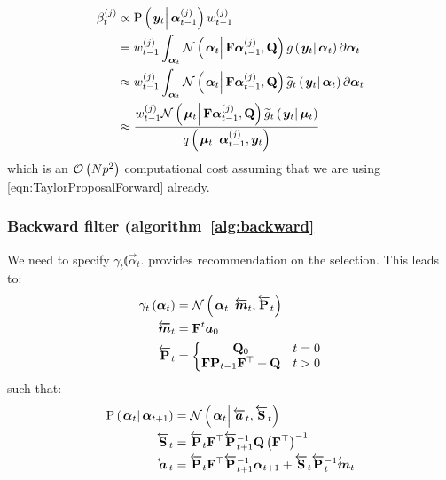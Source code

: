 \begin{equation}
\begin{split}
	\partic{\beta}{t}{j} &\propto  \propC{\vec{y}_t}{\partic{\vec{\alpha}}{t-1}{j}}\partic{w}{t-1}{j} \\
%
	& =  \partic{w}{t-1}{j} \int_{\vec{\alpha}_t} 
		\normalC{\vec{\alpha}_t}{\mat{F}\partic{\vec{\alpha}}{t-1}{j}}{\mat{Q}}
		\optorC{g}{\vec{y}_t}{\vec{\alpha}_t}
		\partial \vec{\alpha}_t \\
%
	& \approx \partic{w}{t-1}{j} \int_{\vec{\alpha}_t} 
		\normalC{\vec{\alpha}_t}{\mat{F}\partic{\vec{\alpha}}{t-1}{j}}{\mat{Q}}
		\optorC{\widetilde{g}_t}{\vec{y}_t}{\vec{\alpha}_t}
		\partial \vec{\alpha}_t \\
%
	& \approx \frac{
		\partic{w}{t-1}{j}
		\normalC{\vec{\mu}_t}{\mat{F}\partic{\vec{\alpha}}{t-1}{j}}{\mat{Q}}
		\optorC{\widetilde{g}_t}{\vec{y}_t}{\vec{\mu}_t}
	}{ %
		\IDC{\vec{\mu}_t}{\partic{\vec{\alpha}}{t-1}{j}, \vec{y}_t}
	}
\end{split}
\end{equation}
%
%
which is an $\mathcal{O}\left( Np^2\right)$ computational cost assuming that we are using \eqref{eqn:TaylorProposalForward} already.

\subsubsection*{Backward filter (algorithm~\ref{alg:backward}}
We need to specify $\gamma_t\Lparen{\vec{\alpha}_t}$. \citet[page 69 and 70]{briers10} provides recommendation on the selection. This leads to:
\begin{equation}\begin{split}
	\gamma_t\Lparen{\vec{\alpha}_t} &=
		\normalC{\vec{\alpha}_t}{\vecLarrow{m}_t}{\matLarrow{P}_t} \\
%
	\vecLarrow{m}_t &= \mat{F}^t\vec{a}_0 \\
%
	\matLarrow{P}_t &= \left\{
		\begin{matrix} \mat{Q}_0 & t = 0 \\ \mat{F}\mat{P}_{t - 1}\mat{F}^\top + \mat{Q} & t > 0   \end{matrix} \right.
\end{split}\end{equation}
%
%
such that:
\begin{equation}\begin{split}
	\propC{\vec{\alpha}_t}{\vec{\alpha}_{t+1}} &= 
	\normalC{\vec{\alpha}_t}{\vecLarrow{a}_t}{\matLarrow{S}_t} \\ 
%
	\matLarrow{S}_t &= \matLarrow{P}_t\mat{F}^\top\matLarrow{P}_{t + 1}^{-1}\mat{Q}\Lparen{\mat{F}^\top}^{-1} \\
%
	\vecLarrow{a}_t &= 
		\matLarrow{P}_t\mat{F}^\top\matLarrow{P}_{t + 1}^{-1}\vec{\alpha}_{t+1}
		+ \matLarrow{S}_t\matLarrow{P}_t^{-1} \vecLarrow{m}_t
\end{split}\end{equation}

